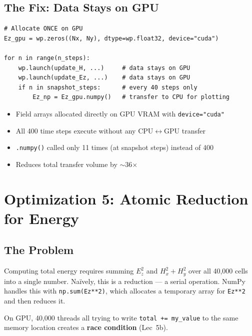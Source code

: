 \documentclass[11pt,a4paper]{article}
\begin{document}
\subsection{The Fix: Data Stays on GPU}

\begin{lstlisting}[caption={Allocation on GPU; transfer only for snapshots}]
# Allocate ONCE on GPU
Ez_gpu = wp.zeros((Nx, Ny), dtype=wp.float32, device="cuda")

for n in range(n_steps):
    wp.launch(update_H, ...)     # data stays on GPU
    wp.launch(update_Ez, ...)    # data stays on GPU
    if n in snapshot_steps:      # every 40 steps only
        Ez_np = Ez_gpu.numpy()   # transfer to CPU for plotting
\end{lstlisting}

\begin{tcolorbox}[colback=green!3, colframe=okgreen, title=\textbf{Fix \#4: Keep data on GPU}]
\begin{itemize}[nosep]
    \item Field arrays allocated directly on GPU VRAM with \texttt{device="cuda"}
    \item All 400 time steps execute without any CPU$\leftrightarrow$GPU transfer
    \item \texttt{.numpy()} called only 11 times (at snapshot steps) instead of 400
    \item Reduces total transfer volume by $\sim$36$\times$
\end{itemize}
\end{tcolorbox}


\section{Optimization 5: Atomic Reduction for Energy}

\subsection{The Problem}

\begin{tcolorbox}[colback=red!3, colframe=warnred, title=\textbf{Bottleneck \#5: Energy reduction}]
Computing total energy requires summing $E_z^2$ and $H_x^2 + H_y^2$ over all 40,000 cells into a single number. Na\"ively, this is a reduction --- a serial operation. NumPy handles this with \texttt{np.sum(Ez**2)}, which allocates a temporary array for \texttt{Ez**2} and then reduces it.

On GPU, 40,000 threads all trying to write \texttt{total += my\_value} to the same memory location creates a \textbf{race condition} (Lec~5b).
\end{tcolorbox}
\end{document}
